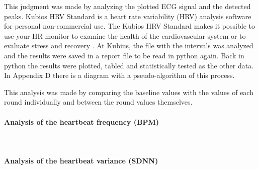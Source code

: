 This judgment was made by analyzing the plotted ECG signal and the detected peaks. Kubios HRV Standard is a heart rate variability (HRV) analysis software for personal non-commercial use. The Kubios HRV Standard makes it possible to use your HR monitor to examine the health of the cardiovascular system or to evaluate stress and recovery \cite{kubios}. At Kubius, the file with the intervals was analyzed and the results were saved in a report file to be read in python again. Back in python the results were plotted, tabled and statistically tested as the other data. In Appendix D there is a diagram with a pseudo-algorithm of this process.

This analysis was made by comparing the baseline values with the values of each round individually and between the round values themselves.

\paragraph{Analysis of the heartbeat frequency (BPM)}\mbox{}\\



%
%
\paragraph{Analysis of the heartbeat variance (SDNN)}\mbox{}\\
%
